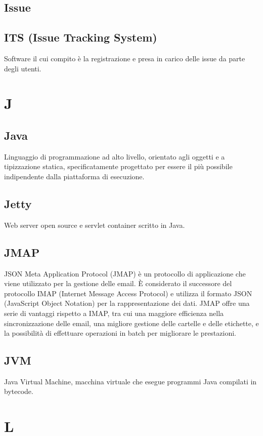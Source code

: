 \documentclass[12pt]{article}
\begin{document}
		\subsection{Issue}
		

		\subsection{ITS (Issue Tracking System)}
			Software il cui compito è la registrazione e presa in carico delle issue da parte degli utenti.
	\clearpage
	\section{J}
		\subsection{Java}
			Linguaggio di programmazione ad alto livello, orientato agli oggetti e a tipizzazione statica, specificatamente progettato per essere il più possibile indipendente dalla piattaforma di esecuzione.
		\subsection{Jetty}
			Web server open source e servlet container scritto in Java.

		\subsection{JMAP}
			JSON Meta Application Protocol (JMAP) è un protocollo di applicazione che viene utilizzato per la gestione delle email. È considerato il successore del protocollo IMAP (Internet Message Access Protocol) e utilizza il formato JSON (JavaScript Object Notation) per la rappresentazione dei dati. JMAP offre una serie di vantaggi rispetto a IMAP, tra cui una maggiore efficienza nella sincronizzazione delle email, una migliore gestione delle cartelle e delle etichette, e la possibilità di effettuare operazioni in batch per migliorare le prestazioni. 

		\subsection{JVM}
			Java Virtual Machine, macchina virtuale che esegue programmi Java compilati in bytecode.
	\clearpage
	\section{L}
\end{document}

